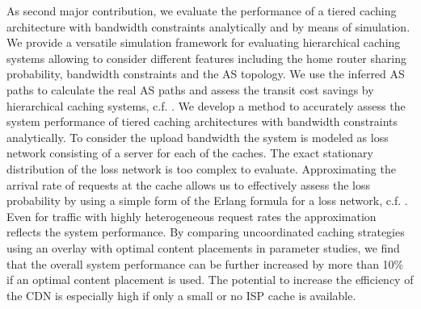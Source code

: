 As second major contribution, we evaluate the performance of a tiered caching architecture with bandwidth constraints analytically and by means of simulation.
We provide a versatile simulation framework for evaluating hierarchical caching systems allowing to consider different features including the home router sharing probability, bandwidth constraints and the AS topology.
We use the inferred AS paths to calculate the real AS paths and assess the transit cost savings by hierarchical caching systems, c.f. \cite{lareida2015augmenting,rbhorst-demo}.
We develop a method to accurately assess the system performance of tiered caching architectures with bandwidth constraints analytically.
To consider the upload bandwidth the system is modeled as loss network consisting of a server for each of the caches.
The exact stationary distribution of the loss network is too complex to evaluate.
Approximating the arrival rate of requests at the cache allows us to effectively assess the loss probability by using a simple form of the Erlang formula for a loss network, c.f. \cite{burger2016hierarchical}.
Even for traffic with highly heterogeneous request rates the approximation reflects the system performance.
By comparing uncoordinated caching strategies using an overlay with optimal content placements in parameter studies, we find that the overall system performance can be further increased by more than 10\% if an optimal content placement is used.
The potential to increase the efficiency of the CDN is especially high if only a small or no ISP cache is available.

